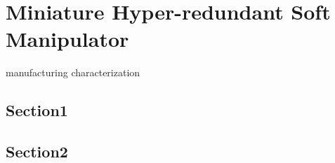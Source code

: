 \chapter{Miniature Hyper-redundant Soft Manipulator}
manufacturing
characterization
\section{Section1}
\section{Section2}